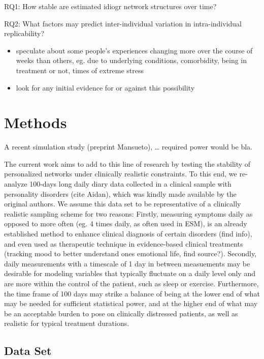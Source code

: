 \documentclass[
  english,
  man]{apa6}
\begin{document}
RQ1: How stable are estimated idiogr network structures over time?

RQ2: What factors may predict inter-individual variation in intra-individual replicability?

\begin{itemize}
\item
  speculate about some people's experiences changing more over the course of weeks than others, eg. due to underlying conditions, comorbidity, being in treatment or not, times of extreme stress
\item
  look for any initial evidence for or against this possibility
\end{itemize}

\hypertarget{methods}{%
\section{Methods}\label{methods}}

A recent simulation study (preprint Mansueto), \ldots{} required power would be bla.

The current work aims to add to this line of research by testing the stability of personalized networks under clinically realistic constraints. To this end, we re-analyze 100-days long daily diary data collected in a clinical sample with personality disorders (cite Aidan), which was kindly made available by the original authors. We assume this data set to be representative of a clinically realistic sampling scheme for two reasons: Firstly, measuring symptoms daily as opposed to more often (eg. 4 times daily, as often used in ESM), is an already established method to enhance clinical diagnosis of certain disorders (find info), and even used as therapeutic technique in evidence-based clinical treatments (tracking mood to better understand ones emotional life, find source?). Secondly, daily measurements with a timescale of 1 day in between measuements may be desirable for modeling variables that typically fluctuate on a daily level only and are more within the control of the patient, such as sleep or exercise. Furthermore, the time frame of 100 days may strike a balance of being at the lower end of what may be needed for sufficient statistical power, and at the higher end of what may be an acceptable burden to pose on clinically distressed patients, as well as realistic for typical treatment durations.

\hypertarget{data-set}{%
\subsection{Data Set}\label{data-set}}
\end{document}
